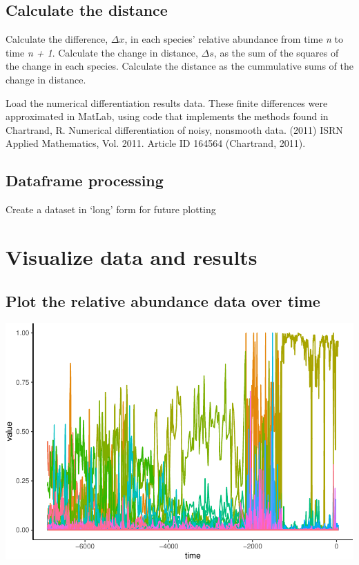 \documentclass[12pt,twoside,openany]{reedthesis}
\begin{document}
\hypertarget{calculate-the-distance}{%
\subsection{Calculate the distance}\label{calculate-the-distance}}

Calculate the difference, \(\Delta x\), in each species' relative abundance from time \emph{n} to time \emph{n + 1}. Calculate the change in distance, \(\Delta s\), as the sum of the squares of the change in each species. Calculate the distance as the cummulative sums of the change in distance.

Load the numerical differentiation results data. These finite differences were approximated in MatLab, using code that implements the methods found in Chartrand, R. Numerical differentiation of noisy, nonsmooth data. (2011) ISRN Applied Mathematics, Vol. 2011. Article ID 164564 (Chartrand, 2011).

\hypertarget{dataframe-processing}{%
\subsection{Dataframe processing}\label{dataframe-processing}}

Create a dataset in `long' form for future plotting

\hypertarget{visualize-data-and-results}{%
\section{Visualize data and results}\label{visualize-data-and-results}}

\hypertarget{plot-the-relative-abundance-data-over-time}{%
\subsection{Plot the relative abundance data over time}\label{plot-the-relative-abundance-data-over-time}}

\includegraphics{_myDissertation_files/figure-latex/unnamed-chunk-7-1.pdf}
\end{document}
